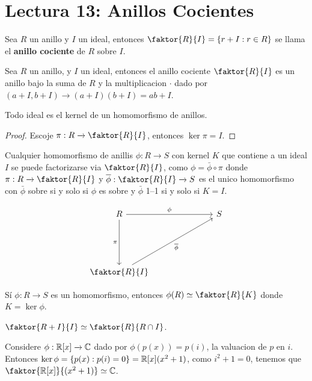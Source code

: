 \section*{Lectura 13: Anillos Cocientes}

\begin{definition}
    Sea $R$ un anillo y $I$ un ideal, entonces $\faktor{R}{I}=\{r+I : r \in R\}$
    se llama el \textbf{anillo cociente} de $R$ sobre $I$.
\end{definition}

\begin{lemma}\label{13.56}
    Sea $R$ un anillo, y  $I$ un ideal, entonces el anillo cociente
    $\faktor{R}{I}$ es un anillo bajo la suma de $R$ y la multiplicacion $\cdot$
    dado por $(a+I,b+I) \xrightarrow{} (a+I)(b+I)=ab+I$.
\end{lemma}

\begin{lemma}\label{13.57}
    Todo ideal es el kernel de un homomorfismo de anillos.
\end{lemma}
\begin{proof}
    Escoje $\pi:R \xrightarrow{} \faktor{R}{I}$, entonces $\ker{\pi}=I$.
\end{proof}

\begin{theorem}\label{13.58}
    Cualquier homomorfismo de anillis $\phi:R \xrightarrow{} S$ con kernel $K$
    que contiene a un ideal  $I$ se puede factorizarse via  $\faktor{R}{I}$,
    como $\phi=\bar{\phi} \circ \pi$ donde $\pi:R \xrightarrow{} \faktor{R}{I}$
    y $\bar{\phi}:\faktor{R}{I} \xrightarrow{} S$ es el unico homomorfismo con
    $\bar{\phi}$ sobre si y solo si $\phi$ es sobre y  $\bar{\phi}$ 1--1 si y
    solo si $K=I$.

    \[\begin{tikzcd}
	R &&& S \\
	\\
	\\
	{\faktor{R}{I}}
	\arrow["\phi", from=1-1, to=1-4]
	\arrow["{\bar{\phi}}"', from=4-1, to=1-4]
	\arrow["\pi"', from=1-1, to=4-1]
\end{tikzcd}\]

\end{theorem}

\begin{theorem}\label{13.59}
    S\'i $\phi:R \xrightarrow{} S$ es un homomorfismo, entonces $\phi(R) \simeq
    \faktor{R}{K}$ donde $K=\ker{\phi}$.
\end{theorem}

\begin{theorem}\label{13.60}
    $\faktor{R+I}{I} \simeq \faktor{R}{R \cap I}$.
\end{theorem}

\begin{example}\label{}
    Considere $\phi:\mathbb{R}[x] \xrightarrow{} \mathbb{C}$ dado por $\phi(p(x))=p(i)$, la
    valuacion de $p$ en $i$. Entonces $\ker{\phi}=\{p(x) : p(i)=0\}=\mathbb{R}[x](x^2+1)$,
    como $i^2+1=0$, tenemos que $\faktor{\R[x]}{(x^2+1)} \simeq \C$.
\end{example}
